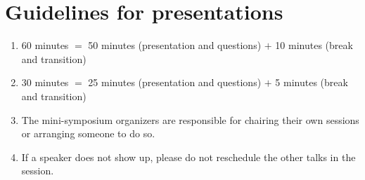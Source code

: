 \documentclass[a4paper]{article}
\begin{document}



\newpage

\section*{Guidelines for presentations}
\begin{enumerate}
\item 60 minutes $=$ 50 minutes (presentation and questions) $+$ 10 minutes (break and transition)
\item 30 minutes $=$ 25 minutes (presentation and questions) $+$ 5 minutes (break and transition)
\item The mini-symposium organizers are responsible for chairing their own sessions or arranging someone to do so.
\item If a speaker does not show up, please do not reschedule the other talks in the session.
\end{enumerate}
\end{document}
